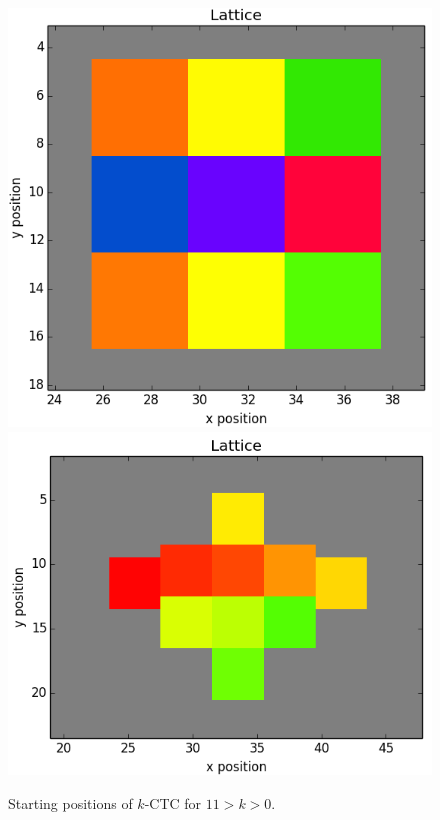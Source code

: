 \documentclass[12pt]{article}
\begin{document}
\begin{figure}[H]
	\includegraphics[scale=0.20]{img/9ctc_start}
	\includegraphics[scale=0.20]{img/10ctc_start}
	\caption{Starting positions of $k$-CTC for $11>k>0$.}
	\label{racestart}
\end{figure}
\end{document}
